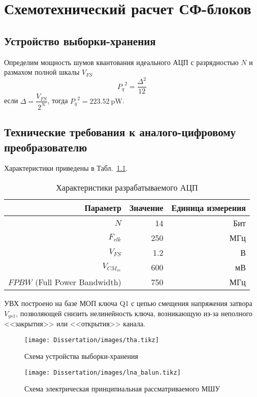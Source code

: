 \chapter{Схемотехнический расчет СФ-блоков}

\section{Устройство выборки-хранения}
Определим мощность шумов квантования идеального АЦП с разрядностью \(N\) и размахом полной шкалы \(V_{FS}\)
\[ {P_{q}}^2 = \frac{\Delta^2}{12}\]
если \(\Delta = \dfrac{V_{FS}}{2^N}\), тогда \( {P_q}^2 = 223.52~\mathrm{pW} \).

\section*{Технические требования к аналого-цифровому преобразователю}
Характеристики приведены в Табл.~\ref{tab:Parameters}.
\begin{table}[h]
	\caption[Характеристики разрабатываемого АЦП]{Характеристики разрабатываемого АЦП}
	\label{tab:Parameters}
	\centering
	\begin{tabular}{rrr}
		\toprule
		\textbf{Параметр}      & \textbf{Значение} & \textbf{Единица измерения}\\
		\midrule
		\(N\)                 &   14      & Бит\\
		\(F_{clk}\)           &   250     & МГц\\
		\(V_{FS}\)            &   1.2     & В\\
		\(V_{CM_{in}}\)                   &   600     & мВ\\
		\(FPBW\) (Full Power Bandwidth)   & 750 & МГц\\
		\bottomrule
	\end{tabular}
\end{table}

УВХ построено на базе МОП ключа Q1 с цепью смещения напряжения затвора \(V_{gs1}\), позволяющей снизить нелинейность ключа, возникающую из-за неполного <<закрытия>> или <<открытия>> канала.

\begin{figure}[ht]
	\centering
	\texttt{[image: Dissertation/images/tha.tikz]}
	
	\caption{Схема устройства выборки-хранения}
	\label{ct:bootstrapped_switch}
\end{figure}

\begin{figure}[ht]
	\centering
	\texttt{[image: Dissertation/images/lna\_balun.tikz]}
	
	\caption{Схема электрическая принципиальная рассматриваемого МШУ}
	\label{ct:lna_balun_wo_bias}
\end{figure}

